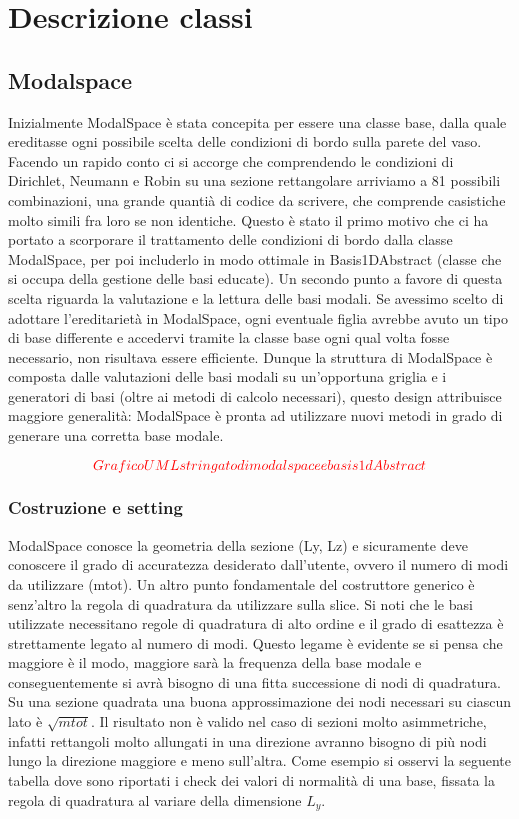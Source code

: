 \chapter{Descrizione classi}
\section{Modalspace}

Inizialmente ModalSpace \`e stata concepita per essere una classe base, dalla quale ereditasse ogni possibile scelta delle condizioni di bordo sulla parete del vaso. Facendo un rapido conto ci si accorge che comprendendo le condizioni di Dirichlet, Neumann e Robin su una sezione rettangolare arriviamo a 81 possibili combinazioni, una grande quanti\`a di codice da scrivere, che comprende casistiche molto simili fra loro se non identiche. Questo \`e stato il primo motivo che ci ha portato a scorporare il trattamento delle condizioni di bordo dalla classe ModalSpace, per poi includerlo in modo ottimale in Basis1DAbstract (classe che si occupa della gestione delle basi educate). Un secondo punto a favore di questa scelta riguarda la valutazione e la lettura delle basi modali. Se avessimo scelto di adottare l'ereditariet\`a in ModalSpace, ogni eventuale figlia avrebbe avuto un tipo di base differente e accedervi tramite la classe base ogni qual volta fosse necessario, non risultava essere efficiente. Dunque la struttura di ModalSpace \`e composta dalle valutazioni delle basi modali su un'opportuna griglia e i generatori di basi (oltre ai metodi di calcolo necessari), questo design attribuisce maggiore generalit\`a: ModalSpace \`e pronta ad utilizzare nuovi metodi in grado di generare una corretta base modale.

\begin{equation}
\textcolor{red}{Grafico UML stringato di modalspace e basis1dAbstract}
\end{equation}

\subsection{Costruzione e setting}
ModalSpace conosce la geometria della sezione (Ly, Lz) e sicuramente deve conoscere il grado di accuratezza desiderato dall'utente, ovvero il numero di modi da utilizzare (mtot). 
Un altro punto fondamentale del costruttore generico \`e senz'altro la regola di quadratura da utilizzare sulla slice. Si noti che le basi utilizzate necessitano regole di quadratura di alto ordine e il grado di esattezza \`e strettamente legato al numero di modi. Questo legame \`e evidente se si pensa che maggiore \`e il modo, maggiore sar\`a la frequenza della base modale e conseguentemente si avr\`a bisogno di una fitta successione di nodi di quadratura. Su una sezione quadrata una buona approssimazione dei nodi necessari su ciascun lato \`e $\sqrt{mtot}$. Il risultato non \`e valido nel caso di sezioni molto asimmetriche, infatti rettangoli molto allungati in una direzione avranno bisogno di pi\`u nodi lungo la direzione maggiore e meno sull'altra. Come esempio si osservi la seguente tabella dove sono riportati i check dei valori di normalit\`a di una base, fissata la regola di quadratura al variare della dimensione $L_y$.

